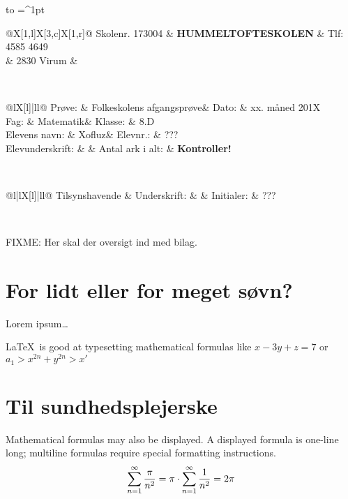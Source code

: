 \documentclass[a4,12pt]{article}
\makeatletter
\newcommand{\skoleklasse}{8.D}
\newcommand{\proevetype}{Folkeskolens afgangsprøve}
\newcommand{\proevefag}{Matematik}
\newcommand{\elevnavn}{Xofluz}
\newcommand{\elevnummer}{???}
\newcommand{\tilsynshavende}{???}
\newcommand{\eksamensdato}{xx. måned 201X}
\newcommand{\antalarkialt}{\pageref*{LastPage} \textbf{Kontroller!}}
\newcommand{\eksamensforsideboks}{
\noindent
\begin{tabu} to  \textwidth {|X[c]|}
  \hline
  \tabulinesep=^1pt
  \begin{tabu} {@{}X[1,l]X[3,c]X[1,r]@{}}
    Skolenr. 173004 & {\large \textbf{HUMMELTOFTESKOLEN}} & Tlf: 4585 4649 \\
  & 2830 Virum & \\
  \end{tabu} \\
  \hline
  \begin{tabu} {@{}lX[l]|ll@{}}
    Prøve: & \proevetype & Dato: & \eksamensdato \\
    Fag: & \proevefag & Klasse: & \skoleklasse \\
    Elevens navn: & \elevnavn & Elevnr.: & \elevnummer \\
    Elevunderskrift: & & Antal ark i alt: & \antalarkialt \\[0.5cm]
  \end{tabu} \\
  \hline
  \begin{tabu} {@{}l|lX[l]|ll@{}}
    Tilsynshavende & Underskrift: & & Initialer: & \tilsynshavende \\[0.5cm]
  \end{tabu} \\
  \hline
\end{tabu}
\vspace{1cm}
}
\makeatother
\begin{document}
\thispagestyle{plain}
\eksamensforsideboks


FIXME: Her skal der oversigt ind med bilag.

\section{For lidt eller for meget søvn?}

Lorem ipsum\ldots

\LaTeX\ is good at typesetting mathematical formulas
like
       \( x-3y + z = 7 \) 
or
       \( a_{1} > x^{2n} + y^{2n} > x' \)

\section{Til sundhedsplejerske}
Mathematical formulas may also be displayed.
A displayed formula is one-line long; multiline
formulas require special formatting instructions.
\[
  \sum\limits_{n=1}^\infty{\pi \over n^2} = \pi \cdot \sum\limits_{n=1}^\infty{1 \over n^2} = 2\pi
\]

\end{document}
